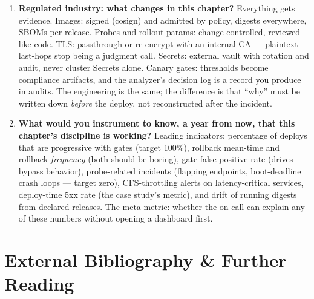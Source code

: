 \begin{enumerate}[label=\textbf{Q\arabic*.}, leftmargin=1.6cm, start=29]
        (gRPC \texttt{MAX\_CONNECTION\_AGE}, WS renegotiation), so drains
        complete in bounded time; rebalance deliberately on scale events;
        size \texttt{terminationGracePeriodSeconds} to connection
        lifetime, not request latency; and consider a dedicated
        connection-tier deployment with its own, gentler rollout policy
        (Chapter~\ref{ch:async_apis}, Chapter~\ref{ch:grpc}).
  \item \textbf{Regulated industry: what changes in this chapter?}
        Everything gets evidence. Images: signed (cosign) and admitted
        by policy, digests everywhere, SBOMs per release. Probes and
        rollout params: change-controlled, reviewed like code. TLS:
        passthrough or re-encrypt with an internal CA --- plaintext
        last-hops stop being a judgment call. Secrets: external vault
        with rotation and audit, never cluster Secrets alone. Canary
        gates: thresholds become compliance artifacts, and the analyzer's
        decision log is a record you produce in audits. The engineering
        is the same; the difference is that ``why'' must be written down
        \emph{before} the deploy, not reconstructed after the incident.
  \item \textbf{What would you instrument to know, a year from now, that
        this chapter's discipline is working?}
        Leading indicators: percentage of deploys that are progressive
        with gates (target 100\%), rollback mean-time and rollback
        \emph{frequency} (both should be boring), gate false-positive
        rate (drives bypass behavior), probe-related incidents (flapping
        endpoints, boot-deadline crash loops --- target zero),
        CFS-throttling alerts on latency-critical services, deploy-time
        5xx rate (the case study's metric), and drift of running digests
        from declared releases. The meta-metric: whether the on-call
        can explain any of these numbers without opening a dashboard
        first.
\end{enumerate}

\section{External Bibliography \& Further Reading}
\label{sec:ch17-bibliography}

